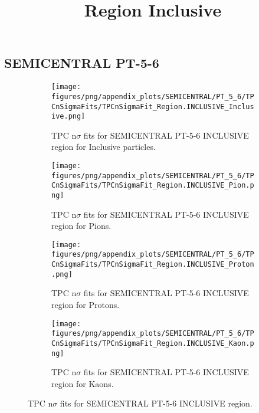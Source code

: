             \subsection{SEMICENTRAL PT-5-6}
            \begin{figure}[H]
                \title{Region Inclusive}
                \begin{subfigure}[b]{0.5\textwidth}
                    \centering
                    \texttt{[image: figures/png/appendix\_plots/SEMICENTRAL/PT\_5\_6/TPCnSigmaFits/TPCnSigmaFit\_Region.INCLUSIVE\_Inclusive.png]}
                    \caption{TPC n$\sigma$ fits for SEMICENTRAL PT-5-6 INCLUSIVE region for Inclusive particles.}
                    \label{fig:appendix_SEMICENTRAL_PT-5-6_INCLUSIVE_Inclusive}
                \end{subfigure}
                \begin{subfigure}[b]{0.5\textwidth}
                    \centering
                    \texttt{[image: figures/png/appendix\_plots/SEMICENTRAL/PT\_5\_6/TPCnSigmaFits/TPCnSigmaFit\_Region.INCLUSIVE\_Pion.png]}
                    \caption{TPC n$\sigma$ fits for SEMICENTRAL PT-5-6 INCLUSIVE region for Pions.}
                    \label{fig:appendix_SEMICENTRAL_PT-5-6_INCLUSIVE_Pion}
                \end{subfigure}
                \begin{subfigure}[b]{0.5\textwidth}
                    \centering
                    \texttt{[image: figures/png/appendix\_plots/SEMICENTRAL/PT\_5\_6/TPCnSigmaFits/TPCnSigmaFit\_Region.INCLUSIVE\_Proton.png]}
                    \caption{TPC n$\sigma$ fits for SEMICENTRAL PT-5-6 INCLUSIVE region for Protons.}
                    \label{fig:appendix_SEMICENTRAL_PT-5-6_INCLUSIVE_Proton}
                \end{subfigure}
                \begin{subfigure}[b]{0.5\textwidth}
                    \centering
                    \texttt{[image: figures/png/appendix\_plots/SEMICENTRAL/PT\_5\_6/TPCnSigmaFits/TPCnSigmaFit\_Region.INCLUSIVE\_Kaon.png]}
                    \caption{TPC n$\sigma$ fits for SEMICENTRAL PT-5-6 INCLUSIVE region for Kaons.}
                    \label{fig:appendix_SEMICENTRAL_PT-5-6_INCLUSIVE_Kaon}
                \end{subfigure}
                \caption{TPC n$\sigma$ fits for SEMICENTRAL PT-5-6 INCLUSIVE region.}
                \label{fig:appendix_SEMICENTRAL_PT-5-6_INCLUSIVE}
            \end{figure}
